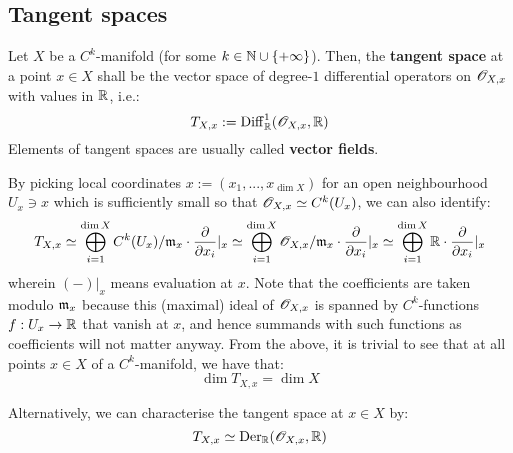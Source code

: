     \subsection{Tangent spaces}
        \begin{definition} \label{def: tangent_spaces}
            Let $X$ be a $C^k$-manifold (for some $k \in \mathbb{N} \cup \{+\infty\}$). Then, the \textbf{tangent space} at a point $x \in X$ shall be the vector space of degree-$1$ differential operators on $\mathscr{O}_{X, x}$ with values in $\mathbb{R}$, i.e.:
                $$T_{X, x} := \mathrm{Diff}^1_{\mathbb{R}}( \mathscr{O}_{X, x}, \mathbb{R} )$$
            Elements of tangent spaces are usually called \textbf{vector fields}.
        \end{definition}
        By picking local coordinates $x := (x_1, ..., x_{\dim X})$ for an open neighbourhood $U_x \ni x$ which is sufficiently small so that $\mathscr{O}_{X, x} \simeq C^k(U_x)$, we can also identify:
            $$T_{X, x} \simeq \bigoplus_{i = 1}^{\dim X} C^k(U_x)/\mathfrak{m}_x \cdot \frac{\partial}{\partial x_i} |_x \simeq \bigoplus_{i = 1}^{\dim X} \mathscr{O}_{X, x}/\mathfrak{m}_x \cdot \frac{\partial}{\partial x_i} |_x \simeq \bigoplus_{i = 1}^{\dim X} \mathbb{R} \cdot \frac{\partial}{\partial x_i} |_x$$
        wherein $(-) |_x$ means evaluation at $x$. Note that the coefficients are taken modulo $\mathfrak{m}_x$ because this (maximal) ideal of $\mathscr{O}_{X, x}$ is spanned by $C^k$-functions $f: U_x \to \mathbb{R}$ that vanish at $x$, and hence summands with such functions as coefficients will not matter anyway. From the above, it is trivial to see that at all points $x \in X$ of a $C^k$-manifold, we have that:
            $$\dim T_{X, x} = \dim X$$

        Alternatively, we can characterise the tangent space at $x \in X$ by:
            $$T_{X, x} \simeq \mathrm{Der}_{\mathbb{R}}(\mathscr{O}_{X, x}, \mathbb{R})$$

